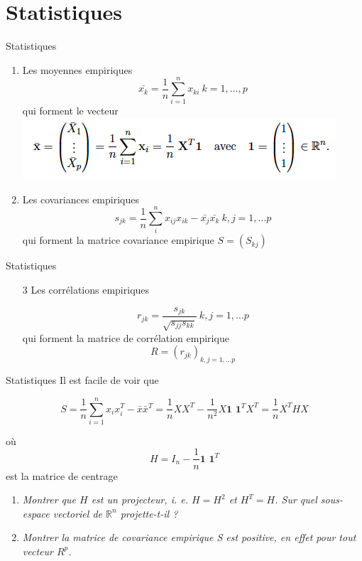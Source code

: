 \documentclass[12pt]{beamer}
\begin{document}
\section{Statistiques}
\begin{frame}{Statistiques}

  \begin{enumerate}
  \item Les moyennes empiriques
  $$\bar{x_k}=\frac{1}{n}\sum_{i=1}^nx_{ki} \ k=1, \ldots, p $$ qui forment le vecteur 
  \includegraphics[scale=0.6]{X_bar.png} 
  \item
  Les covariances empiriques
  $$ s_{jk}=\frac{1}{n}\sum_{i}^n x_{ij}x_{ik}-\bar{x_j}\bar{x_k}  \  k,j=1, \ldots p $$ qui forment la matrice covariance empirique $ S=(S_{kj}) $
  \end{enumerate}
\end{frame}




 

 
 
 \begin{frame}{Statistiques}

  \begin{enumerate}
  \item[3] Les corrélations empiriques
  
  $$ r_{jk}=\frac{s_{jk}}{\sqrt{s_{jj}s_{kk}}}   \  k,j=1, \ldots p $$  qui forment la matrice de corrélation empirique
  $$ R=(r_{jk})_{k, j=1, \ldots p} $$ 
  \end{enumerate}
\end{frame}

\begin{frame}{Statistiques}
Il est facile de voir que  

$$ S=\frac{1}{n}\sum_{i=1}^nx_ix_i^T-\bar{x}\bar{x}^T=\frac{1}{n}XX^T-\frac{1}{n^2}X\textbf{1 1}^TX^T=\frac{1}{n}X^THX$$  

où $$ H=I_n-\frac{1}{n}\textbf{1 1}^T $$ est la matrice de centrage

\begin{enumerate}
\item \textit{Montrer que $H$ est un projecteur, i. e. $H = H^2$ et $H^T = H$. Sur quel sous-espace vectoriel de $\mathbb{R}^n$ projette-t-il ?}

\item \textit{Montrer la matrice de covariance empirique S est positive, en effet pour tout vecteur $R^p$.}

\end{enumerate}


\end{frame}
\end{document}

